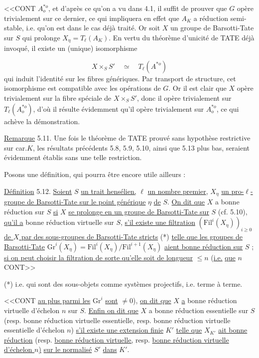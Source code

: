 <<CONT $A^{*o}_o$, et d'après ce qu'on a vu dans 4.1, il suffit de prouver que $G$ opère trivialement sur ce dernier, ce qui impliquera en effet que $A_K$ a réduction semi-stable, i.e. qu'on est dans le cas déjà traité. Or soit $X$ un groupe de Barsotti-Tate sur $S$ qui prolonge $X_\eta = T_\ell(A_K)$. En vertu du théorème d'unicité de TATE déjà invoqué, il existe un (unique) isomorphisme

\begin{equation*}
X \times_S S' \quad \simeq \quad T_\ell(A^{*o})
\end{equation*}
qui induit l'identité sur les fibres génériques. Par transport de structure, cet isomorphisme est compatible avec les opérations de $G$. Or il est clair que $X$ opère trivialement sur la fibre spéciale de $X \times_S S'$, donc il opère trivialement sur $T_\ell(A^{*o}_o)$, d'où il résulte évidemment qu'il opère trivialement sur $A^{*o}_o$, ce qui achève la démonstration.

\underline{Remarque} 5.11. Une fois le théorème de TATE prouvé sans hypothèse restrictive sur car.$K$, les résultats précédents 5.8, 5.9, 5.10, ainsi que 5.13 plus bas, seraient évidemment établis sans une telle restriction.

Posons une définition, qui pourra être encore utile ailleurs :

\underline{Définition} 5.12. \underline{Soient} $S$ \underline{un trait hensélien,} $\ell$ \underline{un nombre premier}, $X_\eta$ \underline{un pro-$\ell$-groupe de Barsotti-Tate sur le point générique} $\eta$ \underline{de} $S$. \underline{On dit que} $X$ a bonne réduction sur $S$ \underline{si} $X$ \underline{se prolonge en un groupe de Barsotti-Tate sur} $S$ (cf. 5.10), \underline{qu'il a} bonne réduction virtuelle sur $S$, \underline{s'il existe une filtration} $(\mathrm{Fil}^i(X_\eta))_{i \geq 0}$ \underline{de $X$ par des sous-groupes de Barsotti-Tate stricts} (*) \underline{telle que les groupes de Barsotti-Tate} $\mathrm{Gr}^i(X_\eta) = \mathrm{Fil}^i(X_\eta)/\mathrm{Fil}^{i+1}(X_\eta)$ \underline{aient bonne réduction sur} $S$ ; \underline{si on peut choisir la filtration de sorte qu'elle soit de longueur} $\leq n$ (\underline{i.e.} \underline{que} $n$ CONT>>

(*) i.e. qui sont des sous-objets comme systèmes projectifs, i.e. terme à terme.



<<CONT \underline{au plus parmi les} $\mathrm{Gr}^i$ \underline{sont} $\neq 0$), \underline{on dit que} $X$ \underline{a} bonne réduction virtuelle d'échelon $n$ sur $S$. \underline{Enfin on dit que} $X$ a bonne réduction essentielle sur $S$ (resp. bonne réduction virtuelle essentielle, resp. bonne réduction virtuelle essentielle d'échelon $n$) \underline{s'il existe une extension finie} $K'$ \underline{telle que} $X_{K'}$ \underline{ait bonne réduction} (resp. \underline{bonne réduction virtuelle,} resp. \underline{bonne réduction virtuelle d'échelon $n$)} \underline{sur le normalisé} $S'$ \underline{dans} $K'$.


